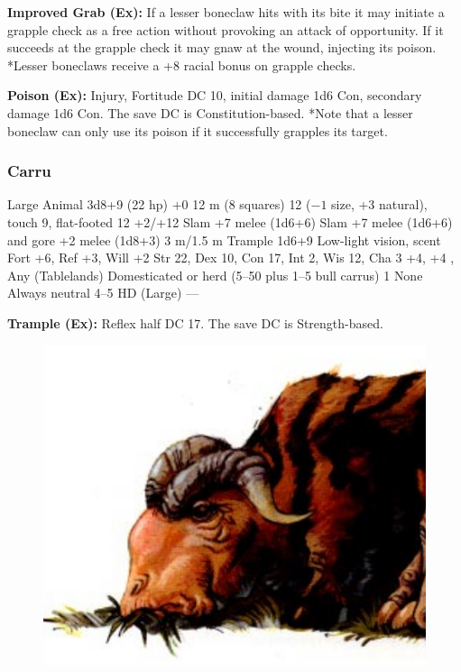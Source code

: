 \textbf{Improved Grab (Ex):} If a lesser boneclaw hits with its bite it may initiate a grapple check as a free action without provoking an attack of opportunity. If it succeeds at the grapple check it may gnaw at the wound, injecting its poison. *Lesser boneclaws receive a +8 racial bonus on grapple checks.

\textbf{Poison (Ex):} Injury, Fortitude DC 10, initial damage 1d6 Con, secondary damage 1d6 Con. The save DC is Constitution-based. *Note that a lesser boneclaw can only use its poison if it successfully grapples its target.

\subsubsection{Carru}
\begin{MonsterStats}
{Large Animal}
{3d8+9 (22 hp)}
{+0}
{12 m (8 squares)}
{12 ($-1$ size, +3 natural), touch 9, flat-footed 12}
{+2/+12}
{Slam +7 melee (1d6+6)}
{Slam +7 melee (1d6+6) and gore +2 melee (1d8+3)}
{3 m/1.5 m}
{Trample 1d6+9}
{Low-light vision, scent}
{Fort +6, Ref +3, Will +2}
{Str 22, Dex 10, Con 17, Int 2, Wis 12, Cha 3}
{ +4,  +4}
{, }
{Any (Tablelands)}
{Domesticated or herd (5--50 plus 1--5 bull carrus)}
{1}
{None}
{Always neutral}
{4--5 HD (Large)}
{---}
\end{MonsterStats}

\textbf{Trample (Ex):} Reflex half DC 17. The save DC is Strength-based.
\begin{figure}[b!]
\centering
\includegraphics[width=\columnwidth]{images/carru.png}
\WOTC
\end{figure}

